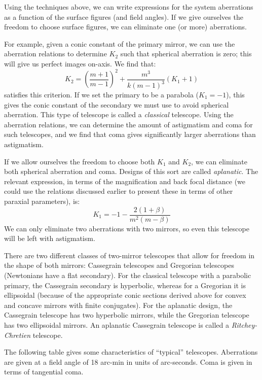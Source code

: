 \documentclass[12pt]{article}
\begin{document}
Using the techniques above, we can write expressions for the system
aberrations as a function of the surface figures (and field angles).
If we give ourselves the freedom to choose surface figures, we can
eliminate one (or more) aberrations.

For example, given a conic constant of the primary mirror, we can use
the aberration relations to determine $K_2$ such that spherical
aberration is zero; this will give us perfect images on-axis. We find
that:
$$ K_2 = \left(\frac{m+1}{m-1}\right)^2 +
    \frac{m^{3}}{k\left(m-1\right)^{3}}\left(K_{1}+1\right) $$
satisfies this criterion.  If we set the primary to be a parabola
($K_{1} = -1$), this gives the conic constant of the secondary we must use to
avoid spherical aberration. This type of telescope is called a
\emph{classical} telescope. Using the aberration relations, we can determine
the amount of astigmatism and coma for such telescopes, and we find
that coma gives significantly larger aberrations than astigmatism.

If we allow ourselves the freedom to choose both $K_1$ and $K_2$,
we can eliminate both spherical aberration and coma.
Designs of this sort are called \emph{aplanatic}.
The relevant expression, in terms of the magnification and
back focal distance (we could use the relations discussed earlier to
present these in terms of other paraxial parameters), is:
$$ K_{1} = -1 - \frac{2(1+\beta)}{m^{2}(m-\beta)} $$
We can only eliminate two aberrations with two mirrors, so even this
telescope will be left with astigmatism.

There are two different classes of two-mirror telescopes that allow
for freedom in the shape of both mirrors: Cassegrain telescopes and
Gregorian telescopes (Newtonians have a flat secondary). For the
classical telescope with a parabolic primary, the Cassegrain
secondary is hyperbolic, whereas for a Gregorian it is ellipsoidal
(because of the appropriate conic sections derived above for convex
and concave mirrors with finite conjugates). For the aplanatic
design, the Cassegrain telescope has two hyperbolic mirrors, while
the Gregorian telescope has two ellipsoidal mirrors. An aplanatic
Cassegrain telescope is called a \emph{Ritchey-Chretien} telescope.

The following table gives some characteristics of ``typical''
telescopes. Aberrations are given at a field angle of 18 arc-min in
units of arc-seconds. Coma is given in terms of tangential coma.
\end{document}
